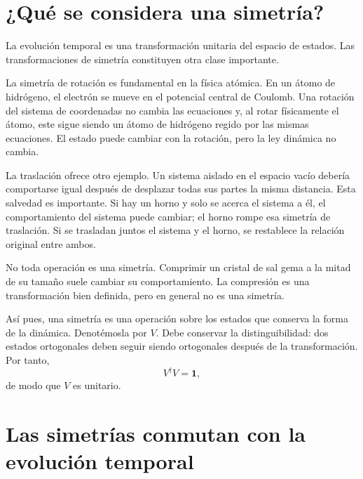 \section{¿Qué se considera una simetría?}

La evolución temporal es una transformación unitaria del espacio de estados. Las transformaciones de simetría constituyen otra clase importante.

La simetría de rotación es fundamental en la física atómica. En un átomo de hidrógeno, el electrón se mueve en el potencial central de Coulomb. Una rotación del sistema de coordenadas no cambia las ecuaciones y, al rotar físicamente el átomo, este sigue siendo un átomo de hidrógeno regido por las mismas ecuaciones. El estado puede cambiar con la rotación, pero la ley dinámica no cambia.

La traslación ofrece otro ejemplo. Un sistema aislado en el espacio vacío debería comportarse igual después de desplazar todas sus partes la misma distancia. Esta salvedad es importante. Si hay un horno y solo se acerca el sistema a él, el comportamiento del sistema puede cambiar; el horno rompe esa simetría de traslación. Si se trasladan juntos el sistema y el horno, se restablece la relación original entre ambos.

No toda operación es una simetría. Comprimir un cristal de sal gema a la mitad de su tamaño suele cambiar su comportamiento. La compresión es una transformación bien definida, pero en general no es una simetría.

Así pues, una simetría es una operación sobre los estados que conserva la forma de la dinámica. Denotémosla por \(V\). Debe conservar la distinguibilidad: dos estados ortogonales deben seguir siendo ortogonales después de la transformación. Por tanto,
\begin{equation}
V^\dagger V=\mathbf 1,
\end{equation}
de modo que \(V\) es unitario.

\section{Las simetrías conmutan con la evolución temporal}

